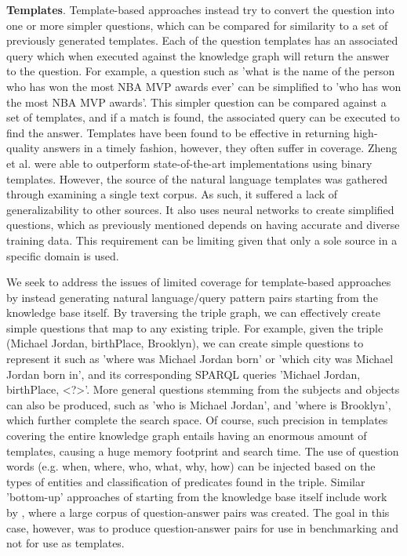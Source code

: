 \documentclass[sigplan,screen]{acmart}
\begin{document}
\textbf{Templates}. Template-based approaches instead try to convert the question into one or more simpler questions, which can be compared for similarity to a set of previously generated templates. Each of the question templates has an associated query which when executed against the knowledge graph will return the answer to the question. For example, a question such as 'what is the name of the person who has won the most NBA MVP awards ever' can be simplified to 'who has won the most NBA MVP awards'. This simpler question can be compared against a set of templates, and if a match is found, the associated query can be executed to find the answer. Templates have been found to be effective in returning high-quality answers in a timely fashion, however, they often suffer in coverage. Zheng et al. were able to outperform state-of-the-art implementations using binary templates. However, the source of the natural language templates was gathered through examining a single text corpus. As such, it suffered a lack of generalizability to other sources. It also uses neural networks to create simplified questions, which as previously mentioned depends on having accurate and diverse training data. This requirement can be limiting given that only a sole source in a specific domain is used.

We seek to address the issues of limited coverage for template-based approaches by instead generating natural language/query pattern pairs starting from the knowledge base itself. By traversing the triple graph, we can effectively create simple questions that map to any existing triple. For example, given the triple (Michael Jordan, birthPlace, Brooklyn), we can create simple questions to represent it such as 'where was Michael Jordan born' or 'which city was Michael Jordan born in', and its corresponding SPARQL queries 'Michael Jordan, birthPlace, <?>'. More general questions stemming from the subjects and objects can also be produced, such as 'who is Michael Jordan', and 'where is Brooklyn', which further complete the search space. Of course, such precision in templates covering the entire knowledge graph entails having an enormous amount of templates, causing a huge memory footprint and search time. The use of question words (e.g. when, where, who, what, why, how) can be injected based on the types of entities and classification of predicates found in the triple. Similar 'bottom-up' approaches of starting from the knowledge base itself include work by \citeauthor{generating-factoids}, where a large corpus of question-answer pairs was created. The goal in this case, however, was to produce question-answer pairs for use in benchmarking and not for use as templates.
\end{document}

